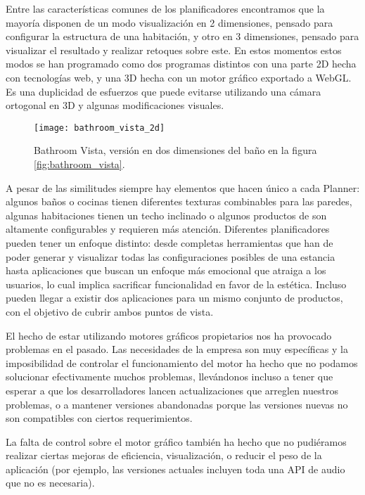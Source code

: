 Entre las características comunes de los planificadores encontramos que la mayoría disponen de un modo visualización en 2 dimensiones, pensado para configurar la estructura de una habitación, y otro en 3 dimensiones, pensado para visualizar el resultado y realizar retoques sobre este. En estos momentos estos modos se han programado como dos programas distintos con una parte 2D hecha con tecnologías web, y una 3D hecha con un motor gráfico exportado a WebGL. Es una duplicidad de esfuerzos que puede evitarse utilizando una cámara ortogonal en 3D y algunas modificaciones visuales.

\begin{figure}[H]
    \centering
    \texttt{[image: bathroom\_vista\_2d]}
    \caption{Bathroom Vista, versión en dos dimensiones del baño en la figura \ref{fig:bathroom_vista}.}
    \label{fig:bathroom_vista_2d}
\end{figure}

A pesar de las similitudes siempre hay elementos que hacen único a cada Planner: algunos baños o cocinas tienen diferentes texturas combinables para las paredes, algunas habitaciones tienen un techo inclinado o algunos productos de son altamente configurables y requieren más atención. Diferentes planificadores pueden tener un enfoque distinto: desde completas herramientas que han de poder generar y visualizar todas las configuraciones posibles de una estancia hasta aplicaciones que buscan un enfoque más emocional que atraiga a los usuarios, lo cual implica sacrificar funcionalidad en favor de la estética. Incluso pueden llegar a existir dos aplicaciones para un mismo conjunto de productos, con el objetivo de cubrir ambos puntos de vista.

El hecho de estar utilizando motores gráficos propietarios nos ha provocado problemas en el pasado. Las necesidades de la empresa son muy específicas y la imposibilidad de controlar el funcionamiento del motor ha hecho que no podamos solucionar efectivamente muchos problemas, llevándonos incluso a tener que esperar a que los desarrolladores lancen actualizaciones que arreglen nuestros problemas, o a mantener versiones abandonadas porque las versiones nuevas no son compatibles con ciertos requerimientos.

La falta de control sobre el motor gráfico también ha hecho que no pudiéramos realizar ciertas mejoras de eficiencia, visualización, o reducir el peso de la aplicación (por ejemplo, las versiones actuales incluyen toda una API de audio que no es necesaria).

